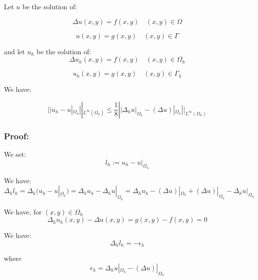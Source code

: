 Let $u$ be the solution of:

\begin{equation*}
\Delta u(x, y) = f(x, y) \quad (x, y) \in \Omega
\end{equation*}

\begin{equation*}
u(x, y) = g(x, y) \quad (x, y) \in \Gamma
\end{equation*}

and let $u_h$ be the solution of:
\begin{equation*}
\Delta u_h(x, y) = f(x, y) \quad (x, y) \in \Omega_h
\end{equation*}

\begin{equation*}
u_h(x, y) = g(x, y) \quad (x, y) \in \Gamma_h
\end{equation*}

We have:

\begin{equation*}
|| u_h - u|_{\Omega_h} ||_{L^\infty(\overline{\Omega_h})} \le \frac{1}{8} ||\Delta_h u|_{\Omega_h} - (\Delta u)|_{\Omega_h} ||_{L^\infty(\Omega_h)}
\end{equation*}

\subsubsection{Proof:}

We set:
\begin{equation*}
l_h := u_h - u|_{\overline{\Omega_h}}
\end{equation*}

We have:
\begin{equation*}
\Delta_h l_h = \Delta_h (u_h - u|_{\overline{\Omega_h}}) = \Delta_h u_h - \Delta_h u|_{\overline{\Omega_h}} = \Delta_h u_h - (\Delta u)|_{\Omega_h} + (\Delta u)|_{\Omega_h} - \Delta_h u|_{\Omega_h}
\end{equation*}

We have, for $(x, y) \in \Omega_h$
\begin{equation*}
\Delta_h u_h(x, y) - \Delta u (x, y) = g(x, y) - f(x, y) = 0
\end{equation*}

We have:
\begin{equation*}
\Delta_h l_h = - \epsilon_h
\end{equation*}

where
\begin{equation*}
\epsilon_h = \Delta_h u|_{\Omega_h} - (\Delta u)|_{\Omega_h}
\end{equation*}

